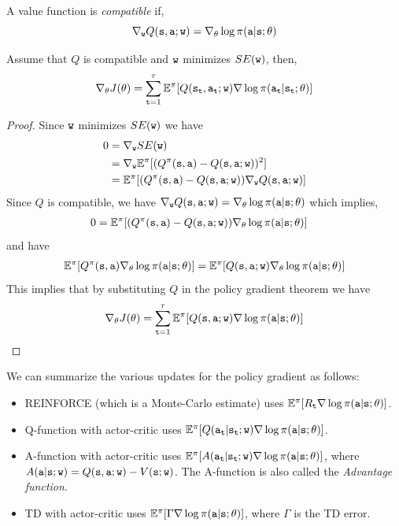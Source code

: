 A value function is {\em compatible} if,
\[
\nabla_{\tt w} Q({\tt s},{\tt a};{\tt w})= \nabla_\theta
\log \pi({\tt a}|{\tt s};\theta)
\]


\begin{theorem}
Assume that $Q$ is compatible and ${\tt w}$ minimizes $SE({\tt w})$,
then,
\[
\nabla_\theta J(\theta)=\sum_{{\tt t}=1}^\tau \mathbb{E}^\pi[Q({\tt s}_{\tt t},{\tt a}_{\tt t};{\tt w})
\nabla \log \pi({\tt a}_{\tt t}|{\tt s}_{\tt t};\theta)]
\]
\end{theorem}

\begin{proof}
Since ${\tt w}$ minimizes $SE({\tt w})$ we have
\begin{align*}
0 & = \nabla_{\tt w} SE({\tt w})\\
&= \nabla_{\tt w} \mathbb{E}^\pi[(Q^\pi({\tt s},{\tt a})-Q({\tt s},{\tt a};{\tt w}))^2]\\
&=
\mathbb{E}^\pi[(Q^\pi({\tt s},{\tt a})-Q({\tt s},{\tt a};{\tt w}))\nabla_{\tt w}
Q({\tt s},{\tt a};{\tt w})]
\end{align*}
Since $Q$ is compatible, we have $\nabla_{\tt w}
Q({\tt s},{\tt a};{\tt w})= \nabla_\theta \log
\pi({\tt a}|{\tt s};\theta)$ which implies,
\begin{align*}
0&=
\mathbb{E}^\pi[(Q^\pi({\tt s},{\tt a})-Q({\tt s},{\tt a};{\tt w}))\nabla_\theta
\log \pi({\tt a}|{\tt s};\theta)]
\end{align*}
and have
\begin{align*}
 \mathbb{E}^\pi[Q^\pi({\tt s},{\tt a})\nabla_\theta \log \pi({\tt a}|{\tt s};\theta)] = \mathbb{E}^\pi[Q({\tt s},{\tt a};{\tt w})\nabla_\theta \log \pi({\tt a}|{\tt s};\theta)]
\end{align*}
This implies that by substituting $Q$ in the policy gradient theorem
we have
\[
\nabla_\theta J(\theta) = \sum_{{\tt t}=1}^\tau \mathbb{E}^\pi[Q({\tt s},{\tt a};{\tt w})
\nabla \log \pi({\tt a}|{\tt s};\theta)]
\]
\end{proof}

We can summarize the various updates for the policy gradient as
follows:
\begin{itemize}
\item REINFORCE (which is a Monte-Carlo estimate) uses
$\mathbb{E}^\pi[R_{\tt t} \nabla\log\pi({\tt a}|{\tt s};\theta) ]$.
\item Q-function with actor-critic uses
$\mathbb{E}^\pi[Q({\tt a}_{\tt t}|{\tt s}_{\tt t};{\tt w})
\nabla\log\pi({\tt a}|{\tt s};\theta) ]$.
\item A-function with actor-critic uses
$\mathbb{E}^\pi[A({\tt a}_{\tt t}|{\tt s}_{\tt t};{\tt w})
\nabla\log\pi({\tt a}|{\tt s};\theta) ]$, where
$A({\tt a}|{\tt s};{\tt w})=Q({\tt s},{\tt a};{\tt w})-V({\tt s};{\tt w})$. The A-function is also called the \emph{Advantage function}.
\item TD with actor-critic uses
$\mathbb{E}^\pi[\Gamma\nabla\log\pi({\tt a}|{\tt s};\theta) ]$, where
$\Gamma$ is the TD error.
\end{itemize}

